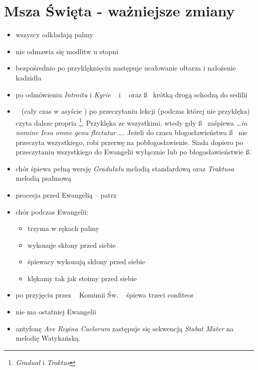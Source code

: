 \section{Msza Święta - ważniejsze zmiany}
\begin{itemize}
	\item wszyscy odkładają palmy
	\item nie odmawia się modlitw u stopni
	\item bezpośrednio po przyklęknięciu następuje ucałowanie ołtarza i
	      nałożenie kadzidła
	\item po odmówieniu \textit{Introitu} i \textit{Kyrie} \ii~ i \dd~ oraz \ss~
	      krótką drogą schodzą do sedilii
	\item \ii~ (cały czas w asyście \dd) po przeczytaniu lekcji (podczas której
	      nie przyklęka) czyta dalsze propria \footnote{\textit{Graduał} i
		      \textit{Traktus}}. Przyklęka ze wszystkimi, wtedy gdy \ss~ zaśpiewa
	      \textit{\dots in nomine Iesu omne genu flectatur \dots}. Jeżeli do
	      czasu błogosławieństwa \ss~ nie przeczyta wszystkiego, robi przerwę na
	      pobłogosławienie. Siada dopiero po przeczytaniu wszystkiego do
	      Ewangelii wyłącznie lub po błogosławieństwie \ss.
	\item chór śpiewa pełną wersję \textit{Gradułału} melodią standardową oraz
	      \textit{Traktusa} melodią psalmową
	\item procesja przed Ewangelią -- patrz \textit{}
	\item chór podczas Ewangelii:

	      \begin{itemize}
		      \item trzyma w rękach palmy
		      \item wykonuje skłony przed siebie
		      \item śpiewacy wykonują skłony przed siebie
		      \item klękamy tak jak stoimy przed siebie
	      \end{itemize}

	\item po przyjęciu przez \ii~ Komunii Św. \dd~ śpiewa trzeci confiteor 
	\item nie ma ostatniej Ewangelii
	\item antyfonę \textit{Ave Regina Caelorum} zastępuje się sekwencją
	      \textit{Stabat Mater} na melodię Watykańską.

\end{itemize}